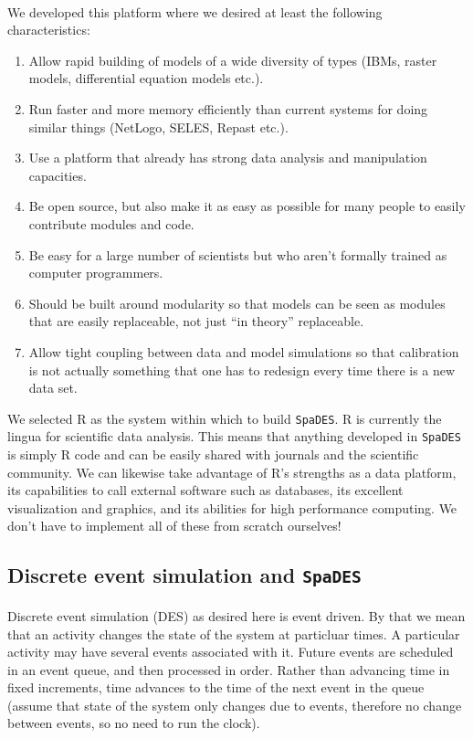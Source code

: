 \documentclass{article}
\begin{document}
\paragraph{}
We developed this platform where we desired at least the following characteristics:
\begin{enumerate}
  \item Allow rapid building of models of a wide diversity of types (IBMs, raster models, differential equation models etc.).
  \item Run faster and more memory efficiently than current systems for doing similar things (NetLogo, SELES, Repast etc.).
  \item Use a platform that already has strong data analysis and manipulation capacities.
  \item Be open source, but also make it as easy as possible for many people to easily contribute modules and code.
  \item Be easy for a large number of scientists but who aren't formally trained as computer programmers.
  \item Should be built around modularity so that models can be seen as modules that are easily replaceable, not just ``in theory'' replaceable.
  \item Allow tight coupling between data and model simulations so that calibration is not actually something that one has to redesign every time there is a new data set.
\end{enumerate}
We selected R as the system within which to build \texttt{SpaDES}. R is currently the lingua for scientific data analysis. This means that anything developed in \texttt{SpaDES} is simply R code and can be easily shared with journals and the scientific community. We can likewise take advantage of R's strengths as a data platform, its capabilities to call external software such as databases, its excellent visualization and graphics, and its abilities for high performance computing. We don't have to implement all of these from scratch ourselves!

\subsection{Discrete event simulation and \texttt{SpaDES}}

\paragraph{}
Discrete event simulation (DES) as desired here is event driven. By that we mean that an activity changes the state of the system at particluar times. A particular activity may have several events associated with it. Future events are scheduled in an event queue, and then processed in order. Rather than advancing time in fixed increments, time advances to the time of the next event in the queue (assume that state of the system only changes due to events, therefore no change between events, so no need to run the clock).
\end{document}
